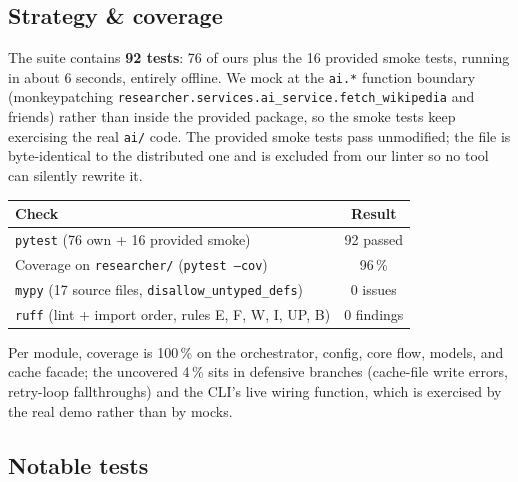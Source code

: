 \documentclass[11pt,a4paper]{article}
\begin{document}
\subsection{Strategy \& coverage}

The suite contains \textbf{92 tests}: 76 of ours plus the 16 provided smoke tests, running in about 6 seconds, entirely offline. We mock at the \texttt{ai.*} function boundary (monkeypatching \texttt{researcher.services.ai\_service.fetch\_wikipedia} and friends) rather than inside the provided package, so the smoke tests keep exercising the real \texttt{ai/} code. The provided smoke tests pass unmodified; the file is byte-identical to the distributed one and is excluded from our linter so no tool can silently rewrite it.

\begin{center}\small
\begin{tabular}{lc}
\toprule
\textbf{Check} & \textbf{Result} \\
\midrule
\texttt{pytest} (76 own + 16 provided smoke) & 92 passed \\
Coverage on \texttt{researcher/} (\texttt{pytest --cov}) & 96\,\% \\
\texttt{mypy} (17 source files, \texttt{disallow\_untyped\_defs}) & 0 issues \\
\texttt{ruff} (lint + import order, rules E, F, W, I, UP, B) & 0 findings \\
\bottomrule
\end{tabular}
\end{center}

Per module, coverage is 100\,\% on the orchestrator, config, core flow, models, and cache facade; the uncovered 4\,\% sits in defensive branches (cache-file write errors, retry-loop fallthroughs) and the CLI's live wiring function, which is exercised by the real demo rather than by mocks.

\subsection{Notable tests}
\end{document}
